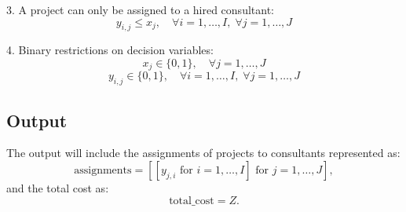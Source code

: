 \documentclass{article}
\begin{document}
3. A project can only be assigned to a hired consultant:
\[
y_{i,j} \leq x_j, \quad \forall i = 1, \ldots, I, \; \forall j = 1, \ldots, J
\]

4. Binary restrictions on decision variables:
\[
x_j \in \{0, 1\}, \quad \forall j = 1, \ldots, J
\]
\[
y_{i,j} \in \{0, 1\}, \quad \forall i = 1, \ldots, I, \; \forall j = 1, \ldots, J
\]

\subsection*{Output}
The output will include the assignments of projects to consultants represented as:
\[
\text{assignments} = [ [y_{j,i} \text{ for } i = 1, \ldots, I] \text{ for } j = 1, \ldots, J], 
\]
and the total cost as:
\[
\text{total\_cost} = Z.
\]
\end{document}
